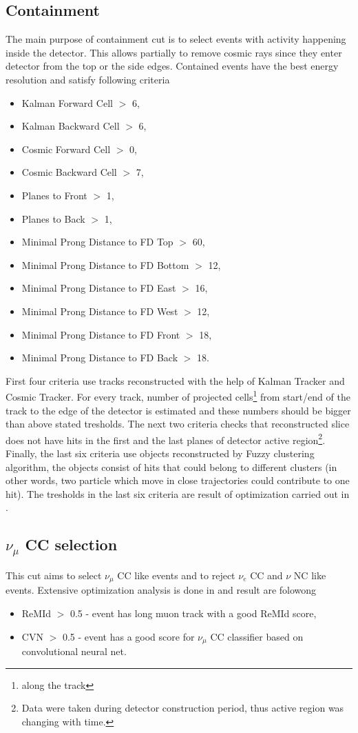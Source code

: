 \subsection{Containment} \label{Containment}
The main purpose of containment cut is to select events with activity happening inside the 
detector. This allows partially to remove cosmic rays since they enter detector from the top 
or the side edges. Contained events have the best energy resolution and satisfy following 
criteria
\begin{itemize}
\item Kalman Forward Cell $>$ 6,
\item Kalman Backward Cell $>$ 6,
\item Cosmic Forward Cell $>$ 0,
\item Cosmic Backward Cell $>$ 7,
\item Planes to Front $>$ 1,
\item Planes to Back $>$ 1,
\item Minimal Prong Distance to FD Top $>$ 60,
\item Minimal Prong Distance to FD Bottom $>$ 12,
\item Minimal Prong Distance to FD East $>$ 16,
\item Minimal Prong Distance to FD West $>$ 12,
\item Minimal Prong Distance to FD Front $>$ 18,
\item Minimal Prong Distance to FD Back $>$ 18.
\end{itemize}
First four criteria use tracks reconstructed with the help of Kalman Tracker and Cosmic Tracker.
For every track, number of projected cells\footnote{along the track} from start/end of the track 
to the edge of the detector is estimated and these numbers should be bigger than above stated
tresholds. The next two criteria checks that reconstructed slice does not have hits in the first
and the last planes of detector active region\footnote{Data were taken during detector construction
period, thus active region was changing with time.}. Finally, the last six criteria use objects
reconstructed by Fuzzy clustering algorithm, the objects consist of hits that could belong to 
different clusters (in other words, two particle which move in close trajectories could contribute
to one hit). The tresholds in the last six criteria are result of optimization carried out in 
\cite{numucont_technote}.

\subsection{$\nu_\mu$ CC selection} \label{CCSel}
This cut aims to select $\nu_\mu$ CC like events and to reject $\nu_e$ CC and $\nu$ NC like events.
Extensive optimization analysis is done in \cite{numupid_technote} and result are folowong
\begin{itemize}
\item ReMId $>$ 0.5 - event has long muon track with a good ReMId score,
\item CVN $>$ 0.5 - event has a good score for $\nu_\mu$ CC classifier based on convolutional neural net.
\end{itemize}

